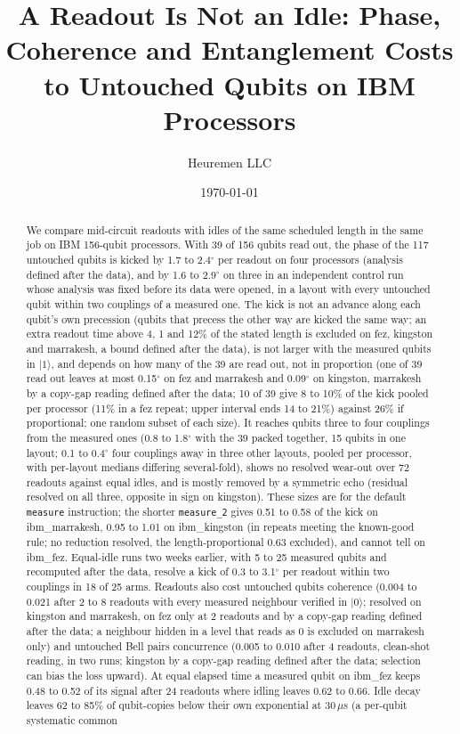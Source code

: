 \documentclass[reprint,amsmath,amssymb,aps,superscriptaddress,nofootinbib]{revtex4-2}
\newcommand{\us}{\,$\mu$s}
\begin{document}
\title{A Readout Is Not an Idle: Phase, Coherence and Entanglement Costs to Untouched Qubits on IBM Processors}

\author{Heuremen LLC}

\date{\today}

\begin{abstract}
We compare mid-circuit readouts with idles of the same scheduled length in the same job on IBM 156-qubit processors. With 39 of 156 qubits read out, the phase of the 117 untouched qubits is kicked by 1.7 to 2.4$^\circ$ per readout on four processors (analysis defined after the data), and by 1.6 to 2.9$^\circ$ on three in an independent control run whose analysis was fixed before its data were opened, in a layout with every untouched qubit within two couplings of a measured one. The kick is not an advance along each qubit's own precession (qubits that precess the other way are kicked the same way; an extra readout time above 4, 1 and 12\% of the stated length is excluded on fez, kingston and marrakesh, a bound defined after the data), is not larger with the measured qubits in $|1\rangle$, and depends on how many of the 39 are read out, not in proportion (one of 39 read out leaves at most 0.15$^\circ$ on fez and marrakesh and 0.09$^\circ$ on kingston, marrakesh by a copy-gap reading defined after the data; 10 of 39 give 8 to 10\% of the kick pooled per processor (11\% in a fez repeat; upper interval ends 14 to 21\%) against 26\% if proportional; one random subset of each size). It reaches qubits three to four couplings from the measured ones (0.8 to 1.8$^\circ$ with the 39 packed together, 15 qubits in one layout; 0.1 to 0.4$^\circ$ four couplings away in three other layouts, pooled per processor, with per-layout medians differing several-fold), shows no resolved wear-out over 72 readouts against equal idles, and is mostly removed by a symmetric echo (residual resolved on all three, opposite in sign on kingston). These sizes are for the default \texttt{measure} instruction; the shorter \texttt{measure\_2} gives 0.51 to 0.58 of the kick on ibm\_marrakesh, 0.95 to 1.01 on ibm\_kingston (in repeats meeting the known-good rule; no reduction resolved, the length-proportional 0.63 excluded), and cannot tell on ibm\_fez. Equal-idle runs two weeks earlier, with 5 to 25 measured qubits and recomputed after the data, resolve a kick of 0.3 to 3.1$^\circ$ per readout within two couplings in 18 of 25 arms. Readouts also cost untouched qubits coherence (0.004 to 0.021 after 2 to 8 readouts with every measured neighbour verified in $|0\rangle$; resolved on kingston and marrakesh, on fez only at 2 readouts and by a copy-gap reading defined after the data; a neighbour hidden in a level that reads as 0 is excluded on marrakesh only) and untouched Bell pairs concurrence (0.005 to 0.010 after 4 readouts, clean-shot reading, in two runs; kingston by a copy-gap reading defined after the data; selection can bias the loss upward). At equal elapsed time a measured qubit on ibm\_fez keeps 0.48 to 0.52 of its signal after 24 readouts where idling leaves 0.62 to 0.66. Idle decay leaves 62 to 85\% of qubit-copies below their own exponential at 30\us{} (a per-qubit systematic common 
\end{abstract}
\end{document}
